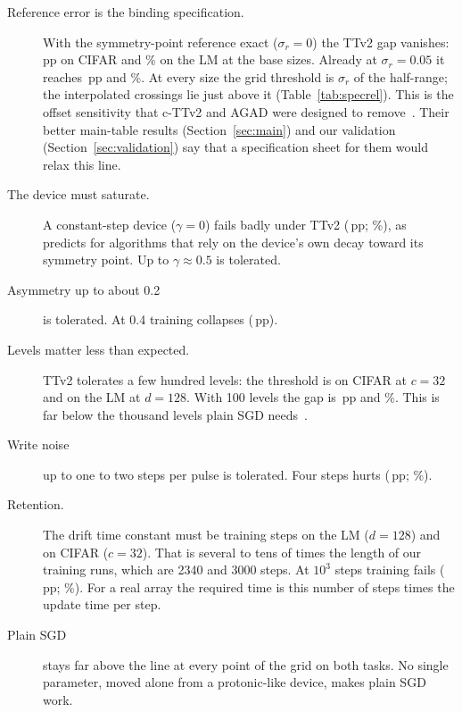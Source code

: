 \begin{description}
\item[Reference error is the binding specification.] With the symmetry-point reference exact ($\sigma_r=0$) the TTv2 gap
      vanishes: \ROatTtvTwoCifarWThreeTwoReferrzero\,pp on CIFAR and \ROatTtvTwoLmWOneTwoEightReferrzero\% on the LM at the base
      sizes. Already at $\sigma_r=0.05$ it reaches \ROatTtvTwoCifarWThreeTwoReferrfive\,pp and
      \ROatTtvTwoLmWOneTwoEightReferrfive\%. At every size the grid threshold is $\sigma_r$ \RSpecrelTtvTwoCifarWThreeTwoRefErr{} of the half-range;
      the interpolated crossings lie just above it (Table~\ref{tab:specrel}).
      This is the offset sensitivity that c-TTv2 and AGAD were designed to remove~\cite{rasch2024}. Their better main-table
      results (Section~\ref{sec:main}) and our validation (Section~\ref{sec:validation}) say that a specification sheet for
      them would relax this line.
\item[The device must saturate.] A constant-step device ($\gamma=0$) fails badly under TTv2
      (\ROatTtvTwoCifarWThreeTwoGammazero\,pp; \ROatTtvTwoLmWOneTwoEightGammazero\%), as~\cite{rasch2024} predicts for algorithms
      that rely on the device's own decay toward its symmetry point. Up to $\gamma\approx0.5$ is tolerated.
\item[Asymmetry up to about 0.2] is tolerated. At 0.4 training collapses (\ROatTtvTwoCifarWThreeTwoAsymfour\,pp).
\item[Levels matter less than expected.] TTv2 tolerates a few hundred levels: the threshold is \RSpecrelTtvTwoCifarWThreeTwoNStates{}
      on CIFAR at $c=32$ and \RSpecrelTtvTwoLmWOneTwoEightNStates{} on the LM at $d=128$. With 100 levels the gap is
      \ROatTtvTwoCifarWThreeTwoLevelshundred\,pp and \ROatTtvTwoLmWOneTwoEightLevelshundred\%. This is far below the thousand
      levels plain SGD needs~\cite{gokmen2016}.
\item[Write noise] up to one to two steps per pulse is tolerated. Four steps hurts (\ROatTtvTwoCifarWThreeTwoCtwocfour\,pp;
      \ROatTtvTwoLmWOneTwoEightCtwocfour\%).
\item[Retention.] The drift time constant must be \RSpecrelTtvTwoLmWOneTwoEightTauSteps{} training steps on the LM ($d=128$)
      and \RSpecrelTtvTwoCifarWThreeTwoTauSteps{} on CIFAR ($c=32$). That is
      several to tens of times the length of our training runs, which are 2340 and 3000 steps. At $10^3$ steps training fails
      (\ROatTtvTwoCifarWThreeTwoTauthree\,pp; \ROatTtvTwoLmWOneTwoEightTauthree\%). For a real array the required time is this
      number of steps times the update time per step.
\item[Plain SGD] stays far above the line at every point of the grid on both tasks. No single parameter, moved alone from a
      protonic-like device, makes plain SGD work.
\end{description}

